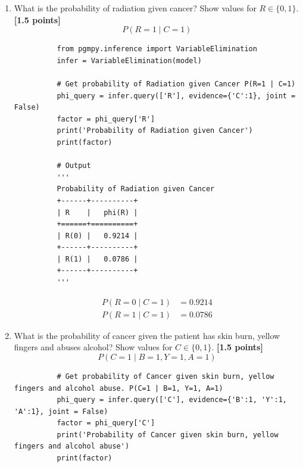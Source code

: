\begin{enumerate}
\begin{center}
        \end{center}
  \item What is the probability of radiation given cancer? Show values for $R\in\{0, 1\}$. {\bf [1.5 points]}
        $$P(R=1\mid C=1)$$
        \begin{lstlisting}
          from pgmpy.inference import VariableElimination
          infer = VariableElimination(model)

          # Get probability of Radiation given Cancer P(R=1 | C=1)
          phi_query = infer.query(['R'], evidence={'C':1}, joint = False)
          factor = phi_query['R']
          print('Probability of Radiation given Cancer')
          print(factor)

          # Output
          '''
          Probability of Radiation given Cancer
          +------+----------+
          | R    |   phi(R) |
          +======+==========+
          | R(0) |   0.9214 |
          +------+----------+
          | R(1) |   0.0786 |
          +------+----------+
          '''
        \end{lstlisting}
        \begin{align*}
          P(R=0\mid C=1) & =0.9214 \\
          P(R=1\mid C=1) & =0.0786
        \end{align*}
  \item What is the probability of cancer given the patient has skin burn, yellow fingers and abuses alcohol? Show values for $C\in\{0, 1\}$. {\bf [1.5 points]}
        $$P(C=1\mid B=1, Y=1, A=1)$$
        \begin{lstlisting}
          # Get probability of Cancer given skin burn, yellow fingers and alcohol abuse. P(C=1 | B=1, Y=1, A=1)
          phi_query = infer.query(['C'], evidence={'B':1, 'Y':1, 'A':1}, joint = False)
          factor = phi_query['C']
          print('Probability of Cancer given skin burn, yellow fingers and alcohol abuse')
          print(factor)


\end{lstlisting}
\end{enumerate}
